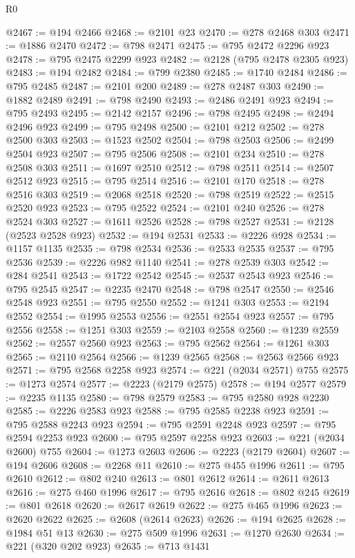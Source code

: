 \begin{lexlean}{R0}
\begin{coremodule}
@2467 := @194 @2466
@2468 := @2101 @23
@2470 := @278 @2468 @303
@2471 := @1886 @2470
@2472 := @798 @2471
@2475 := @795 @2472 @2296 @923
@2478 := @795 @2475 @2299 @923
@2482 := @2128 (@795 @2478 @2305 @923)
@2483 := @194 @2482
@2484 := @799 @2380
@2485 := @1740 @2484
@2486 := @795 @2485
@2487 := @2101 @200
@2489 := @278 @2487 @303
@2490 := @1882 @2489
@2491 := @798 @2490
@2493 := @2486 @2491 @923
@2494 := @795 @2493
@2495 := @2142 @2157
@2496 := @798 @2495
@2498 := @2494 @2496 @923
@2499 := @795 @2498
@2500 := @2101 @212
@2502 := @278 @2500 @303
@2503 := @1523 @2502
@2504 := @798 @2503
@2506 := @2499 @2504 @923
@2507 := @795 @2506
@2508 := @2101 @234
@2510 := @278 @2508 @303
@2511 := @1697 @2510
@2512 := @798 @2511
@2514 := @2507 @2512 @923
@2515 := @795 @2514
@2516 := @2101 @170
@2518 := @278 @2516 @303
@2519 := @2068 @2518
@2520 := @798 @2519
@2522 := @2515 @2520 @923
@2523 := @795 @2522
@2524 := @2101 @240
@2526 := @278 @2524 @303
@2527 := @1611 @2526
@2528 := @798 @2527
@2531 := @2128 (@2523 @2528 @923)
@2532 := @194 @2531
@2533 := @2226 @928
@2534 := @1157 @1135
@2535 := @798 @2534
@2536 := @2533 @2535
@2537 := @795 @2536
@2539 := @2226 @982 @1140
@2541 := @278 @2539 @303
@2542 := @284 @2541
@2543 := @1722 @2542
@2545 := @2537 @2543 @923
@2546 := @795 @2545
@2547 := @2235 @2470
@2548 := @798 @2547
@2550 := @2546 @2548 @923
@2551 := @795 @2550
@2552 := @1241 @303
@2553 := @2194 @2552
@2554 := @1995 @2553
@2556 := @2551 @2554 @923
@2557 := @795 @2556
@2558 := @1251 @303
@2559 := @2103 @2558
@2560 := @1239 @2559
@2562 := @2557 @2560 @923
@2563 := @795 @2562
@2564 := @1261 @303
@2565 := @2110 @2564
@2566 := @1239 @2565
@2568 := @2563 @2566 @923
@2571 := @795 @2568 @2258 @923
@2574 := @221 (@2034 @2571) @755
@2575 := @1273 @2574
@2577 := @2223 (@2179 @2575)
@2578 := @194 @2577
@2579 := @2235 @1135
@2580 := @798 @2579
@2583 := @795 @2580 @928 @2230
@2585 := @2226 @2583 @923
@2588 := @795 @2585 @2238 @923
@2591 := @795 @2588 @2243 @923
@2594 := @795 @2591 @2248 @923
@2597 := @795 @2594 @2253 @923
@2600 := @795 @2597 @2258 @923
@2603 := @221 (@2034 @2600) @755
@2604 := @1273 @2603
@2606 := @2223 (@2179 @2604)
@2607 := @194 @2606
@2608 := @2268 @11
@2610 := @275 @455 @1996
@2611 := @795 @2610
@2612 := @802 @240
@2613 := @801 @2612
@2614 := @2611 @2613
@2616 := @275 @460 @1996
@2617 := @795 @2616
@2618 := @802 @245
@2619 := @801 @2618
@2620 := @2617 @2619
@2622 := @275 @465 @1996
@2623 := @2620 @2622
@2625 := @2608 (@2614 @2623)
@2626 := @194 @2625
@2628 := @1984 @51 @13
@2630 := @275 @509 @1996
@2631 := @1270 @2630
@2634 := @221 (@320 @202 @923)
@2635 := @713 @1431

\end{coremodule}
\end{lexlean}
